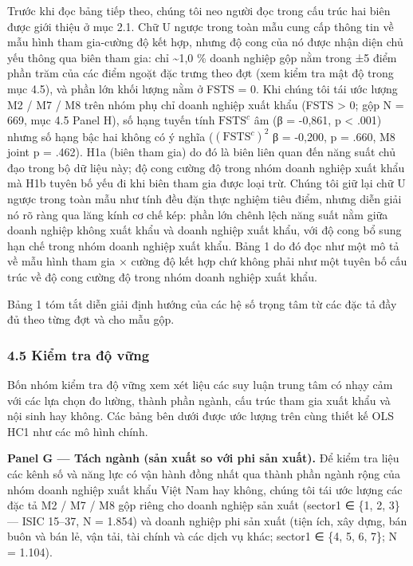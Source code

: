 \documentclass[12pt,a4paper]{article}
\begin{document}
Trước khi đọc bảng tiếp theo, chúng tôi neo người đọc trong cấu trúc hai
biên được giới thiệu ở mục 2.1. Chữ U ngược trong toàn mẫu cung cấp
thông tin về mẫu hình tham gia-cường độ kết hợp, nhưng độ cong của nó
được nhận diện chủ yếu thông qua biên tham gia: chỉ \textasciitilde1,0
\% doanh nghiệp gộp nằm trong ±5 điểm phần trăm của các điểm ngoặt đặc
trưng theo đợt (xem kiểm tra mật độ trong mục 4.5), và phần lớn khối
lượng nằm ở FSTS = 0. Khi chúng tôi tái ước lượng M2 / M7 / M8 trên nhóm
phụ chỉ doanh nghiệp xuất khẩu (FSTS \textgreater{} 0; gộp N = 669, mục
4.5 Panel H), số hạng tuyến tính \(\mathrm{FSTS}^{c}\) âm (β = -0,861, p
\textless{} .001) nhưng số hạng bậc hai không có ý nghĩa
(\((\mathrm{FSTS}^{c})^2\) β = -0,200, p = .660, M8 joint p = .462). H1a
(biên tham gia) do đó là biên liên quan đến năng suất chủ đạo trong bộ
dữ liệu này; độ cong cường độ trong nhóm doanh nghiệp xuất khẩu mà H1b
tuyên bố yếu đi khi biên tham gia được loại trừ. Chúng tôi giữ lại chữ U
ngược trong toàn mẫu như tính đều đặn thực nghiệm tiêu điểm, nhưng diễn
giải nó rõ ràng qua lăng kính cơ chế kép: phần lớn chênh lệch năng suất
nằm giữa doanh nghiệp không xuất khẩu và doanh nghiệp xuất khẩu, với độ
cong bổ sung hạn chế trong nhóm doanh nghiệp xuất khẩu. Bảng 1 do đó đọc
như một mô tả về mẫu hình tham gia × cường độ kết hợp chứ không phải như
một tuyên bố cấu trúc về độ cong cường độ trong nhóm doanh nghiệp xuất
khẩu.

Bảng 1 tóm tắt diễn giải định hướng của các hệ số trọng tâm từ các đặc
tả đầy đủ theo từng đợt và cho mẫu gộp.

\hypertarget{45-kiux1ec3m-tra-ux111ux1ed9-vux1eefng}{%
\subsubsection{4.5 Kiểm tra độ
vững}\label{45-kiux1ec3m-tra-ux111ux1ed9-vux1eefng}}

Bốn nhóm kiểm tra độ vững xem xét liệu các suy luận trung tâm có nhạy
cảm với các lựa chọn đo lường, thành phần ngành, cấu trúc tham gia xuất
khẩu và nội sinh hay không. Các bảng bên dưới được ước lượng trên cùng
thiết kế OLS HC1 như các mô hình chính.

\textbf{Panel G --- Tách ngành (sản xuất so với phi sản xuất).} Để kiểm
tra liệu các kênh số và năng lực có vận hành đồng nhất qua thành phần
ngành rộng của nhóm doanh nghiệp xuất khẩu Việt Nam hay không, chúng tôi
tái ước lượng các đặc tả M2 / M7 / M8 gộp riêng cho doanh nghiệp sản
xuất (sector1 ∈ \{1, 2, 3\} --- ISIC 15--37, N = 1.854) và doanh nghiệp
phi sản xuất (tiện ích, xây dựng, bán buôn và bán lẻ, vận tải, tài chính
và các dịch vụ khác; sector1 ∈ \{4, 5, 6, 7\}; N = 1.104).
\end{document}
